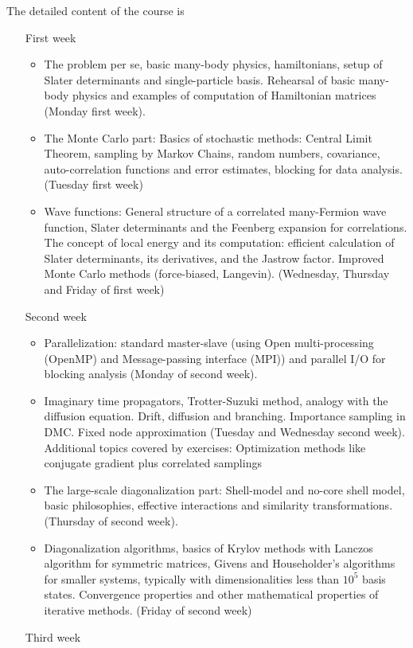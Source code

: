 \documentclass[prc,amsart,english]{revtex4}
\begin{document}
The detailed content of the course is
\begin{enumerate} 
\item[First week]
\begin{itemize}
\item The problem per se, basic many-body physics, hamiltonians,
setup of Slater determinants and single-particle basis.
Rehearsal of basic many-body physics and examples of computation of Hamiltonian matrices (Monday first week).
\item The Monte Carlo part: Basics of stochastic methods: Central Limit Theorem, sampling by Markov Chains, random numbers, covariance,
auto-correlation functions and error estimates,  blocking for data analysis. (Tuesday first week)
\item Wave functions: General structure of a correlated many-Fermion wave function, Slater determinants
and the Feenberg expansion for correlations.
The concept of local energy and its computation: efficient calculation of  Slater determinants, its derivatives,
and the Jastrow factor. Improved Monte Carlo methods (force-biased, Langevin). (Wednesday, Thursday and Friday of first week)
\end{itemize}
\item[Second week]
\begin{itemize}
\item Parallelization: standard master-slave (using Open multi-processing (OpenMP) 
and Message-passing interface (MPI)) and
parallel I/O for blocking analysis (Monday of second week). 
\item Imaginary time propagators, Trotter-Suzuki method, analogy with the diffusion equation. Drift, diffusion
and branching. Importance sampling in DMC. Fixed node approximation (Tuesday and Wednesday second week).
Additional topics covered by exercises: Optimization methods like conjugate gradient plus correlated samplings
\item The large-scale diagonalization part:
Shell-model and no-core shell model, basic philosophies, effective interactions and
similarity transformations. (Thursday of second week).
\item Diagonalization algorithms, basics of Krylov methods with Lanczos algorithm for symmetric matrices,
Givens and Householder's algorithms  for smaller systems, typically with dimensionalities less
than $10^5$ basis states.
Convergence properties and other mathematical properties of iterative methods. (Friday of second week)
\end{itemize}
\item[Third week]

\end{enumerate}
\end{document}

